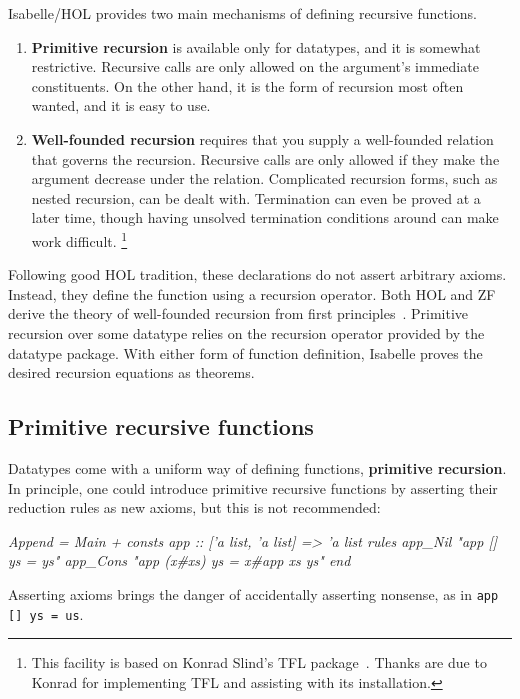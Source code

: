 Isabelle/HOL provides two main mechanisms of defining recursive functions.
\begin{enumerate}
\item \textbf{Primitive recursion} is available only for datatypes, and it is
  somewhat restrictive.  Recursive calls are only allowed on the argument's
  immediate constituents.  On the other hand, it is the form of recursion most
  often wanted, and it is easy to use.
  
\item \textbf{Well-founded recursion} requires that you supply a well-founded
  relation that governs the recursion.  Recursive calls are only allowed if
  they make the argument decrease under the relation.  Complicated recursion
  forms, such as nested recursion, can be dealt with.  Termination can even be
  proved at a later time, though having unsolved termination conditions around
  can make work difficult.%
  \footnote{This facility is based on Konrad Slind's TFL
    package~\cite{slind-tfl}.  Thanks are due to Konrad for implementing TFL
    and assisting with its installation.}
\end{enumerate}

Following good HOL tradition, these declarations do not assert arbitrary
axioms.  Instead, they define the function using a recursion operator.  Both
HOL and ZF derive the theory of well-founded recursion from first
principles~\cite{paulson-set-II}.  Primitive recursion over some datatype
relies on the recursion operator provided by the datatype package.  With
either form of function definition, Isabelle proves the desired recursion
equations as theorems.


\subsection{Primitive recursive functions}
\label{sec:HOL:primrec}

Datatypes come with a uniform way of defining functions, {\bf primitive
  recursion}.  In principle, one could introduce primitive recursive functions
by asserting their reduction rules as new axioms, but this is not recommended:
\begin{ttbox}\slshape
Append = Main +
consts app :: ['a list, 'a list] => 'a list
rules 
   app_Nil   "app [] ys = ys"
   app_Cons  "app (x#xs) ys = x#app xs ys"
end
\end{ttbox}
Asserting axioms brings the danger of accidentally asserting nonsense, as
in \verb$app [] ys = us$.


